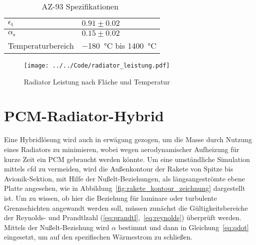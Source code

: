 \begin{table}[H]

  \centering
  \caption{AZ-93 Spezifikationen~\cite{AZ-Technology}}\label{tab:az-93_eigenschaften}

  \begin{tabular}{ll}

    \toprule[1pt]
    $\epsilon_{\text{t}}$ & $0.91 \pm 0.02$ \\

    \midrule[0.5pt]
    $\alpha_{\text{s}}$ & $0.15 \pm 0.02$ \\

    \midrule[0.5pt]
    Temperaturbereich  & \SI{-180}{\degreeCelsius} bis \SI{1400}{\degreeCelsius} \\

    \bottomrule[1pt]
  \end{tabular}
\end{table}

\begin{figure}[H]
  \centering
  \texttt{[image: ../../Code/radiator\_leistung.pdf]}
  \caption{Radiator Leistung nach Fläche und Temperatur}\label{fig:radiator_flaeche_leistung}
\end{figure}

\newpage

\section{PCM-Radiator-Hybrid}\label{sec:pcm_radiator_hybrid}

Eine Hybridlösung wird auch in erwägung gezogen, um die Masse durch Nutzung eines Radiators zu minimieren, wobei wegen aerodynamischer Aufheizung für kurze Zeit ein PCM gebraucht werden könnte.
Um eine umständliche Simulation mittels \ac{cfd} zu vermeiden, wird die Außenkontour der Rakete von Spitze bis Avionik-Sektion, mit Hilfe der Nußelt-Beziehungen, als längsangeströmte ebene Platte angesehen,
wie in Abbildung~\ref{fig:rakete_kontour_zeichnung} dargestellt ist.
Um zu wissen, ob hier die Beziehung für laminare oder turbulente Grenzschichten angewandt werden soll, müssen zunächst die Gültigkeitsbereiche der Reynolds- und Prandtlzahl (\ref{eq:prandtl},~\ref{eq:reynolds}) überprüft werden.
Mittels der Nußelt-Beziehung wird $\alpha$ bestimmt und dann in Gleichung~\ref{eq:qdot} eingesetzt, um auf den spezifischen Wärmestrom zu schließen.

\newpage

